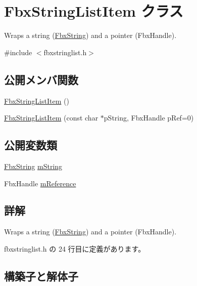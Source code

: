 \hypertarget{class_fbx_string_list_item}{}\section{Fbx\+String\+List\+Item クラス}
\label{class_fbx_string_list_item}


Wraps a string (\hyperlink{class_fbx_string}{Fbx\+String}) and a pointer (Fbx\+Handle).  




{\ttfamily \#include $<$fbxstringlist.\+h$>$}

\subsection*{公開メンバ関数}
\begin{DoxyCompactItemize}
\item 
\hyperlink{class_fbx_string_list_item_a88e0c20fc1919b27a7b7f5ebea2e983b}{Fbx\+String\+List\+Item} ()
\item 
\hyperlink{class_fbx_string_list_item_ab9247b85347d2525b72f67a6ca38b111}{Fbx\+String\+List\+Item} (const char $\ast$p\+String, Fbx\+Handle p\+Ref=0)
\end{DoxyCompactItemize}
\subsection*{公開変数類}
\begin{DoxyCompactItemize}
\item 
\hyperlink{class_fbx_string}{Fbx\+String} \hyperlink{class_fbx_string_list_item_ad084a731438913ea4a34dff1e4652fde}{m\+String}
\item 
Fbx\+Handle \hyperlink{class_fbx_string_list_item_a97c2d888afeccc13053b187d64351417}{m\+Reference}
\end{DoxyCompactItemize}


\subsection{詳解}
Wraps a string (\hyperlink{class_fbx_string}{Fbx\+String}) and a pointer (Fbx\+Handle). 

 fbxstringlist.\+h の 24 行目に定義があります。



\subsection{構築子と解体子}
\mbox{\label{class_fbx_string_list_item_a88e0c20fc1919b27a7b7f5ebea2e983b}} 
